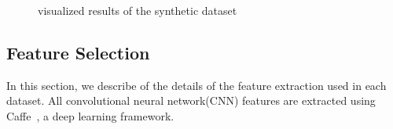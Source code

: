 \documentclass[letterpaper]{article}
\begin{document}
\begin{figure}[htp]
\center
    \caption{visualized results of the synthetic dataset} \label{fig:ensemble_cluster}
\end{figure}


\subsection{Feature Selection}
In this section, we describe of the details of the feature extraction used in each dataset. All convolutional neural network(CNN) features are extracted using Caffe~\cite{jia2014caffe}, a deep learning framework.
\end{document}
